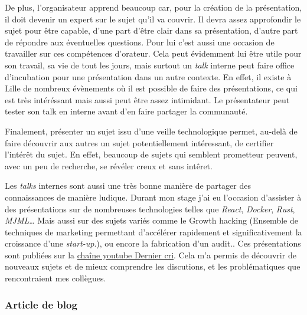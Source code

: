 \documentclass[12pt,a4paper]{article}
\begin{document}
  \bigskip

  De plus, l'organisateur apprend beaucoup car, pour la création de la
  présentation, il doit devenir un expert sur le sujet qu'il va couvrir.
  Il devra assez approfondir le sujet pour être capable, d'une part d'être
  clair dans sa présentation, d'autre part de répondre aux éventuelles
  questions. Pour lui c'est aussi une occasion de travailler sur ces
  compétences d'orateur. Cela peut évidemment lui être utile pour son
  travail, sa vie de tout les jours, mais surtout un \emph{talk} interne
  peut faire office d'incubation pour une présentation dans un autre
  contexte. En effet, il existe à Lille de nombreux évènements où il est
  possible de faire des présentations, ce qui est très intéréssant mais
  aussi peut être assez intimidant. Le présentateur peut tester son talk
  en interne avant d'en faire partager la communauté.

  \bigskip

  Finalement, présenter un sujet issu d'une veille technologique permet,
  au-delà de faire découvrir aux autres un sujet potentiellement
  intéressant, de certifier l'intérêt du sujet. En effet, beaucoup de
  sujets qui semblent prometteur peuvent, avec un peu de recherche, se
  révéler creux et sans intêret.

  \bigskip

  Les \emph{talks} internes sont aussi une très bonne manière de partager
  des connaissances de manière ludique. Durant mon stage j'ai eu
  l'occasion d'assister à des présentations sur de nombreuses technologies
  telles que \emph{React}, \emph{Docker}, \emph{Rust}, \emph{MJML}\ldots{}
  Mais aussi sur des sujets variés comme le Growth hacking (Ensemble de
  techniques de marketing permettant d'accélérer rapidement et
  significativement la croissance d'une \emph{start-up}.), ou encore la
  fabrication d'un audit.. Ces présentations sont publiées sur la
  \href{https://www.youtube.com/channel/UCDfdBlzldhg_PEu3xZTPsHg}{chaîne
  youtube Dernier cri}. Cela m'a permis de découvrir de nouveaux sujets et
  de mieux comprendre les discutions, et les problématiques que
  rencontraient mes collègues.

  \bigskip

  \subsubsection{Article de blog}\label{article-de-blog}

  \bigskip
\end{document}
